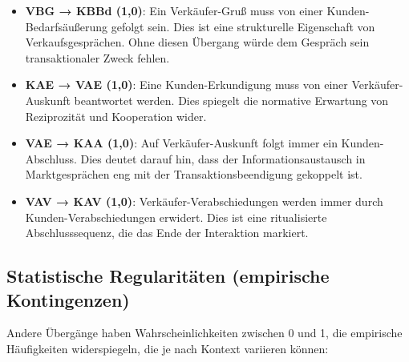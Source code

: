 \documentclass[12pt,a4paper]{article}
\begin{document}
\begin{itemize}
    \item \textbf{VBG → KBBd (1,0)}: Ein Verkäufer-Gruß muss von einer
    Kunden-Bedarfsäußerung gefolgt sein. Dies ist eine strukturelle Eigenschaft
    von Verkaufsgesprächen. Ohne diesen Übergang würde dem Gespräch sein
    transaktionaler Zweck fehlen.
    
    \item \textbf{KAE → VAE (1,0)}: Eine Kunden-Erkundigung muss von einer
    Verkäufer-Auskunft beantwortet werden. Dies spiegelt die normative
    Erwartung von Reziprozität und Kooperation wider.
    
    \item \textbf{VAE → KAA (1,0)}: Auf Verkäufer-Auskunft folgt immer ein
    Kunden-Abschluss. Dies deutet darauf hin, dass der Informationsaustausch
    in Marktgesprächen eng mit der Transaktionsbeendigung gekoppelt ist.
    
    \item \textbf{VAV → KAV (1,0)}: Verkäufer-Verabschiedungen werden immer
    durch Kunden-Verabschiedungen erwidert. Dies ist eine ritualisierte
    Abschlusssequenz, die das Ende der Interaktion markiert.
\end{itemize}

\subsection{Statistische Regularitäten (empirische Kontingenzen)}

Andere Übergänge haben Wahrscheinlichkeiten zwischen 0 und 1, die empirische
Häufigkeiten widerspiegeln, die je nach Kontext variieren können:
\end{document}
